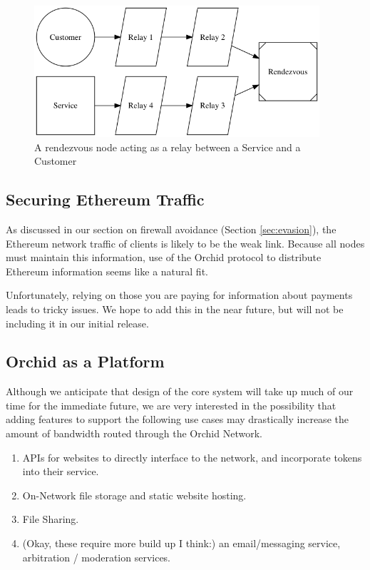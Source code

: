 \documentclass{article}
\newcommand{\orchid}{Orchid}
\newcommand{\Orchid}{\orchid}
\begin{document}
\begin{figure}[htbp]
  \centering
  \includegraphics[width = 300pt]{sttRttc}
  \caption{A rendezvous node acting as a relay between a Service and a Customer}
\end{figure}

\subsection{Securing Ethereum Traffic}
\label{securing-eth}

As discussed in our section on firewall avoidance (Section \ref{sec:evasion}),
the Ethereum network traffic of clients is likely to be the weak
link. Because all nodes must maintain this information, use of the
\Orchid{} protocol to distribute Ethereum information seems like a
natural fit.

Unfortunately, relying on those you are paying for information about
payments leads to tricky issues. We hope to add this in the near
future, but will not be including it in our initial release.

\subsection{\Orchid{} as a Platform}

Although we anticipate that design of the core system will take up
much of our time for the immediate future, we are very interested in
the possibility that adding features to support the following use
cases may drastically increase the amount of bandwidth routed through
the \Orchid{} Network.

\begin{enumerate}
\item APIs for websites to directly interface to the network, and
  incorporate tokens into their service.
\item On-Network file storage and static website hosting.
\item File Sharing.
\item (Okay, these require more build up I think:) an email/messaging
  service, arbitration / moderation services.
\end{enumerate}


\printbibliography
\end{document}
